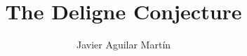 \documentclass{beamer}
\title{The Deligne Conjecture}
\author{Javier Aguilar Mart\'in}
\institute{University of Kent}
\date{}
\theoremstyle{definition}
\begin{document}
\frame{\titlepage}
%
% 
% 
% 

% 



\newcommand{\seti}{\setcounter{saveenumi}{\value{enumi}}}
\newcommand{\conti}{\setcounter{enumi}{\value{saveenumi}}}

\makeatletter
\newcommand{\xRightarrow}[2][]{\ext@arrow 0359\Rightarrowfill@{#1}{#2}}
\makeatother


%	
%




\end{document}
